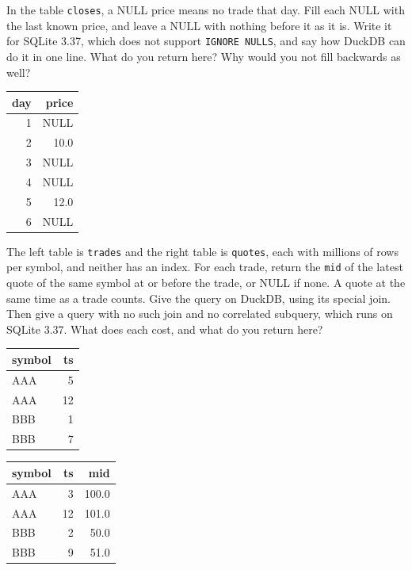 \begin{question}\label{iq:iv3:sql-and-data:20}
In the table \texttt{closes}, a NULL price means no trade that day. Fill each NULL with the last known price, and leave a NULL with nothing before it as it is. Write it for SQLite 3.37, which does not support \texttt{IGNORE NULLS}, and say how DuckDB can do it in one line. What do you return here? Why would you not fill backwards as well?
\begin{center}\small
\begin{tabular}{rr}
day & price\\\hline
1 & NULL\\
2 & 10.0\\
3 & NULL\\
4 & NULL\\
5 & 12.0\\
6 & NULL
\end{tabular}
\end{center}
\end{question}

\begin{question}\label{iq:iv3:sql-and-data:21}
The left table is \texttt{trades} and the right table is \texttt{quotes}, each with millions of rows per symbol, and neither has an index. For each trade, return the \texttt{mid} of the latest quote of the same symbol at or before the trade, or NULL if none. A quote at the same time as a trade counts. Give the query on DuckDB, using its special join. Then give a query with no such join and no correlated subquery, which runs on SQLite 3.37. What does each cost, and what do you return here?
\begin{center}\small
\begin{tabular}{lr}
symbol & ts\\\hline
AAA & 5\\
AAA & 12\\
BBB & 1\\
BBB & 7
\end{tabular}\qquad
\begin{tabular}{lrr}
symbol & ts & mid\\\hline
AAA & 3 & 100.0\\
AAA & 12 & 101.0\\
BBB & 2 & 50.0\\
BBB & 9 & 51.0
\end{tabular}
\end{center}
\end{question}


